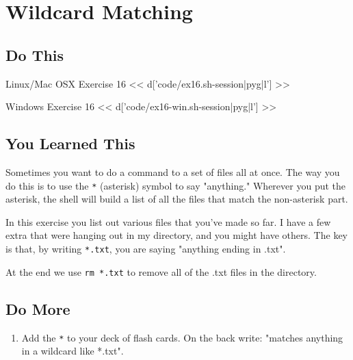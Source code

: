 \chapter{Wildcard Matching}

\section{Do This}

\begin{code}{Linux/Mac OSX Exercise 16}
<< d['code/ex16.sh-session|pyg|l'] >>
\end{code}

\begin{code}{Windows Exercise 16}
<< d['code/ex16-win.sh-session|pyg|l'] >>
\end{code}

\section{You Learned This}

Sometimes you want to do a command to a set of files all at once.  The way you
do this is to use the \verb|*| (asterisk) symbol to say "anything."  Wherever
you put the asterisk, the shell will build a list of all the files that match
the non-asterisk part.

In this exercise you list out various files that you've made so far.  I have a
few extra that were hanging out in my directory, and you might have others.  The
key is that, by writing \verb|*.txt|, you are saying "anything ending in .txt".

At the end we use \verb|rm *.txt| to remove all of the .txt files in the
 directory.

\section{Do More}

\begin{enumerate}
\item Add the \verb|*| to your deck of flash cards.  On the back write: "matches anything in a wildcard like *.txt".
\end{enumerate}

